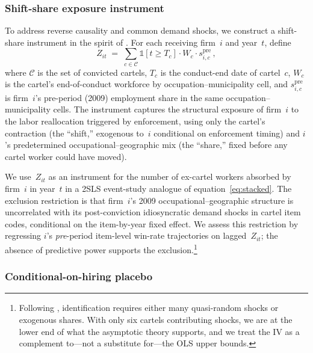 \subsubsection*{Shift-share exposure instrument}

To address reverse causality and common demand shocks, we construct a
shift-share instrument in the spirit of \citet{borusyak2025nonrandom}. For
each receiving firm~$i$ and year~$t$, define
\begin{equation}\label{eq:bartik}
Z_{it} \;=\; \sum_{c \in \mathcal{C}} \mathbb{1}[t \geq T_c]
            \cdot W_c \cdot s_{i,c}^{\text{pre}}\,,
\end{equation}
where $\mathcal{C}$ is the set of convicted cartels, $T_c$ is the
conduct-end date of cartel~$c$, $W_c$ is the cartel's end-of-conduct
workforce by occupation--municipality cell, and $s_{i,c}^{\text{pre}}$ is
firm~$i$'s pre-period (2009) employment share in the same
occupation--municipality cells. The instrument captures the structural
exposure of firm~$i$ to the labor reallocation triggered by enforcement,
using only the cartel's contraction (the ``shift,'' exogenous to~$i$
conditional on enforcement timing) and $i$'s predetermined
occupational--geographic mix (the ``share,'' fixed before any cartel
worker could have moved).

We use~$Z_{it}$ as an instrument for the number of ex-cartel workers
absorbed by firm~$i$ in year~$t$ in a 2SLS event-study analogue of
equation~\eqref{eq:stacked}. The exclusion restriction is that
firm~$i$'s 2009 occupational--geographic structure is uncorrelated with
its post-conviction idiosyncratic demand shocks in cartel item codes,
conditional on the item-by-year fixed effect. We assess this restriction
by regressing $i$'s \emph{pre}-period item-level win-rate trajectories on
lagged~$Z_{it}$; the absence of predictive power supports the
exclusion.\footnote{Following \citet{borusyak2025nonrandom}, identification
requires either many quasi-random shocks or exogenous shares. With only
six cartels contributing shocks, we are at the lower end of what the
asymptotic theory supports, and we treat the IV as a complement to---not a
substitute for---the OLS upper bounds.}

\subsubsection*{Conditional-on-hiring placebo}

